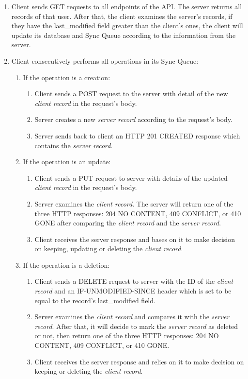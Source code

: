 \begin{enumerate}
   \item Client sends GET requests to all endpoints of the API. The server returns all records of that user. After that, the client examines the server's records, if they have the last\_modified field greater than the client's ones, the client will update its database and Sync Queue according to the information from the server.

   \item Client consecutively performs all operations in its Sync Queue:
     \begin{enumerate}
       \item If the operation is a creation:
         \begin{enumerate}
           \item Client sends a POST request to the server with detail of the new \textit{client record} in the request's body.
           \item Server creates a new \textit{server record} according to the request's body. 
           \item Server sends back to client an HTTP 201 CREATED response which contains the \textit{server record}.
         \end{enumerate}
         
       \item If the operation is an update:
         \begin{enumerate}
           \item Client sends a PUT request to server with details of the updated \textit{client record} in the request's body.
           \item Server examines the \textit{client record}. The server will return one of the three HTTP responses: 204 NO CONTENT, 409 CONFLICT, or 410 GONE after comparing the \textit{client record} and the \textit{server record}. 
           \item Client receives the server response and bases on it to make decision on keeping, updating or deleting the \textit{client record}.
         \end{enumerate}
               
       \item If the operation is a deletion:
         \begin{enumerate}
           \item Client sends a DELETE request to server with the ID of the \textit{client record} and an IF-UNMODIFIED-SINCE header which is set to be equal to the record's last\_modified field.
           \item Server examines the \textit{client record} and compares it with the \textit{server record}. After that, it will decide to mark the \textit{server record} as deleted or not, then return one of the three HTTP responses: 204 NO CONTENT, 409 CONFLICT, or 410 GONE.
           \item Client receives the server response and relies on it to make decision on keeping or deleting the \textit{client record}. 
         \end{enumerate}         
     \end{enumerate}
\end{enumerate}
